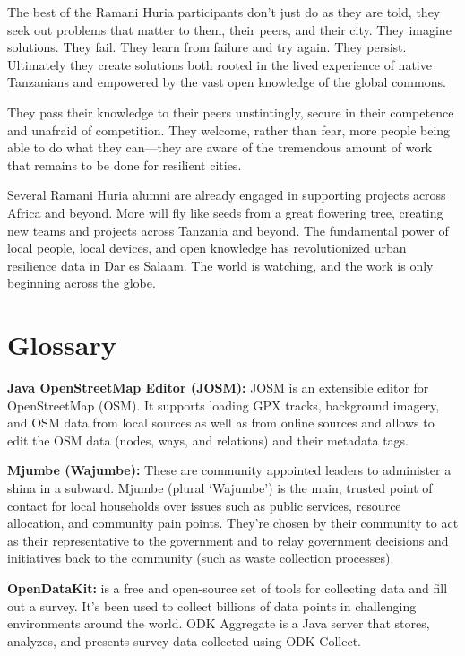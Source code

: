 \documentclass[a4paper,12pt,twoside]{article}
\begin{document}
\begin{multicols}{2}
The best of the Ramani Huria participants don't just do as they are told, they seek out problems that matter to them, their peers, and their city. They imagine solutions. They fail. They learn from failure and try again. They persist. Ultimately they create solutions both rooted in the lived experience of native Tanzanians and empowered by the vast open knowledge of the global commons. 

They pass their knowledge to their peers unstintingly, secure in their competence and unafraid of competition. They welcome, rather than fear, more people being able to do what they can---they are aware of the tremendous amount of work that remains to be done for resilient cities. 

Several Ramani Huria alumni are already engaged in supporting projects across Africa and beyond. More will fly like seeds from a great flowering tree, creating new teams and projects across Tanzania and beyond. The fundamental power of local people, local devices, and open knowledge has revolutionized urban resilience data in Dar es Salaam. The world is watching, and the work is only beginning across the globe.


\end{multicols}

\newpage
\section{Glossary}

\textbf{Java OpenStreetMap Editor (JOSM):} JOSM is an extensible editor for ​OpenStreetMap (OSM). It supports loading GPX tracks, background imagery, and OSM data from local sources as well as from online sources and allows to edit the OSM data (nodes, ways, and relations) and their metadata tags.


\textbf{Mjumbe (Wajumbe):} These are community appointed leaders to administer a shina in a subward. Mjumbe (plural ‘Wajumbe’) is the main, trusted point of contact for local households over issues such as public services, resource allocation, and community pain points. They’re chosen by their community to act as their representative to the government and to relay government decisions and initiatives back to the community (such as waste collection processes).


\textbf {OpenDataKit:} is a free and open-source set of tools for collecting data and fill out a  survey. It's been used to collect billions of data points in challenging environments around the world. ODK Aggregate is a Java server that stores, analyzes, and presents survey data collected using ODK Collect.
\end{document}
